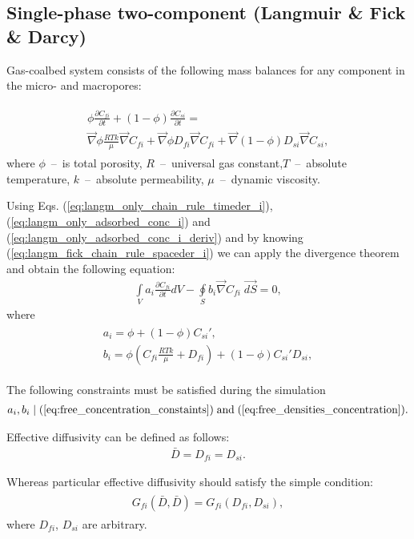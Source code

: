 \subsection*{Single-phase two-component (Langmuir \& Fick \& Darcy)}
Gas-coalbed system consists of the following mass balances for any component in the micro- and macropores:

\begin{eqnarray}
\begin{gathered}
\label{eq:langm_fick_diffusivity_differential}
\phi\frac{\partial C_{fi}}{\partial t} + \left(\mathit{1}-\phi\right)\frac{\partial C_{si}}{\partial t} = \\ \vec{\nabla} \phi\frac{RTk}{\mu} \vec{\nabla}C_{fi} + \vec{\nabla} \phi D_{fi} \vec{\nabla}C_{fi} + \vec{\nabla}\left(\mathit{1}-\phi \right) D_{si} \vec{\nabla}C_{si},
\end{gathered}
\end{eqnarray}
where $\phi$~--~is total porosity, $R$~--~universal gas constant,$T$~--~absolute temperature, $k$~--~absolute permeability, $\mu$~--~dynamic viscosity.

Using Eqs. (\ref{eq:langm_only_chain_rule_timeder_i}), (\ref{eq:langm_only_adsorbed_conc_i}) and (\ref{eq:langm_only_adsorbed_conc_i_deriv}) and by knowing (\ref{eq:langm_fick_chain_rule_spaceder_i}) we can apply the divergence theorem and obtain the following equation:
\begin{eqnarray}
\label{eq:langm_fick_diffusivity_simplified_integral}
\int \limits_{V} a_{i} \frac{\partial C_{fi}}{\partial t} d V - \oint \limits_{S} b_{i} \vec{\nabla}C_{fi} \; \vec{dS} =  \mathit{0},
\end{eqnarray}
where  
\begin{eqnarray}
\begin{gathered}
\label{eq:langm_fick_diffusivity_a_b_coeffs}
a_{i}  =  \phi + \left(\mathit{1}-\phi \right)C_{si}', \\ 
b_{i}  = \phi \left(C_{fi} \frac{RTk}{\mu} + D_{fi}\right) + \left(\mathit{1}-\phi \right) C_{si}'D_{si},
\end{gathered}
\end{eqnarray}

The following constraints must be satisfied during the simulation
\begin{eqnarray}
\label{eq:angm_fick_concentration_constaints}
a_{i}, b_{i} \mid  (\ref{eq:free_concentration_constaints}) \; \text{and} \; (\ref{eq:free_densities_concentration}).
\end{eqnarray}

Effective diffusivity can be defined as follows:
\begin{eqnarray}
	\label{eq:effective_diffusivity_LFD}
	\bar{D} = D_{fi} =D_{si}.
\end{eqnarray}

Whereas particular effective diffusivity should satisfy the simple condition:
\begin{eqnarray}
	\begin{gathered}
		\label{eq:effective_diffusivity_condition_LFD}
		G_{fi}\left(\bar{D} ,\bar{D}\right) = G_{fi}\left(D_{fi}, D_{si} \right),
	\end{gathered}
\end{eqnarray}
where $D_{fi}$, $D_{si}$ are arbitrary. 